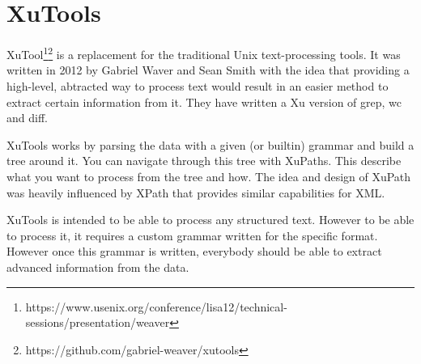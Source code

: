 \chapter{XuTools}

XuTool\footnote{https://www.usenix.org/conference/lisa12/technical-sessions/presentation/weaver}\footnote{https://github.com/gabriel-weaver/xutools} is a replacement for the traditional Unix text-processing tools. It was written in 2012 by Gabriel Waver and Sean Smith with the idea that providing a high-level, abtracted way to process text would result in an easier method to extract certain information from it. They have written a Xu version of grep, wc and diff.


XuTools works by parsing the data with a given (or builtin) grammar and build a tree around it. You can navigate through this tree with XuPaths. This describe what you want to process from the tree and how. The idea and design of XuPath was heavily influenced by XPath that provides similar capabilities for XML.

XuTools is intended to be able to process any structured text. However to be able to process it, it requires a custom grammar written for the specific format. However once this grammar is written, everybody should be able to extract advanced information from the data.

